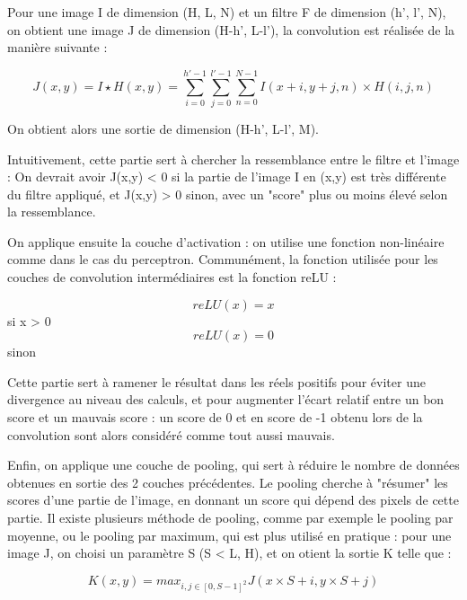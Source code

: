 Pour une image I de dimension (H, L, N) et un filtre F de dimension (h', l', N), on obtient une image J de dimension (H-h', L-l'), la convolution est réalisée de la manière suivante :

\begin{equation}
    J(x, y) = I \star H (x, y) = \sum_{i=0}^{h' - 1} \sum_{j=0}^{l'- 1} \sum_{n=0}^{N - 1} I(x+i, y+j, n) \times H(i, j, n)
\end{equation}

On obtient alors une sortie de dimension (H-h', L-l', M).

Intuitivement, cette partie sert à chercher la ressemblance entre le filtre et l'image : 
On devrait avoir J(x,y) < 0 si la partie de l'image I en (x,y) est très différente du filtre appliqué, et J(x,y) > 0 sinon, avec un "score" plus ou moins élevé selon la ressemblance.


On applique ensuite la couche d'activation : on utilise une fonction non-linéaire comme dans le cas du perceptron. 
Communément, la fonction utilisée pour les couches de convolution intermédiaires est la fonction reLU :

\begin{equation}
    reLU (x) = x
\end{equation} si x > 0
\begin{equation}
    reLU (x) = 0 
\end{equation} sinon


\newpage 

Cette partie sert à ramener le résultat dans les réels positifs pour éviter une divergence au niveau des calculs, et pour augmenter l'écart relatif entre un bon score et un mauvais score : un score de 0 et en score de -1 obtenu lors de la convolution sont alors considéré comme tout aussi mauvais.

Enfin, on applique une couche de pooling, qui sert à réduire le nombre de données obtenues en sortie des 2 couches précédentes.
Le pooling cherche à "résumer" les scores d'une partie de l'image, en donnant un score qui dépend des pixels de cette partie.
Il existe plusieurs méthode de pooling, comme par exemple le pooling par moyenne, ou le pooling par maximum, qui est plus utilisé en pratique :
pour une image J, on choisi un paramètre S (S < L, H), et on otient la sortie K telle que :

\begin{equation}
    K(x, y) = max_{i,j \in [0, S-1] ^2 } { J(x \times S + i , y \times S + j ) }
\end{equation}


